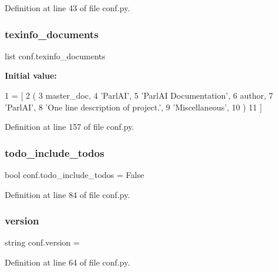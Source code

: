Definition at line 43 of file conf.\+py.

\mbox{\label{namespaceconf_a54b0faed214ac92017d5689efbb10672}} 
\subsubsection{\texorpdfstring{texinfo\+\_\+documents}{texinfo\_documents}}
{\footnotesize\ttfamily list conf.\+texinfo\+\_\+documents}

{\bfseries Initial value\+:}
\begin{DoxyCode}
1 =  [
2     (
3         master\_doc,
4         \textcolor{stringliteral}{'ParlAI'},
5         \textcolor{stringliteral}{'ParlAI Documentation'},
6         author,
7         \textcolor{stringliteral}{'ParlAI'},
8         \textcolor{stringliteral}{'One line description of project.'},
9         \textcolor{stringliteral}{'Miscellaneous'},
10     )
11 ]
\end{DoxyCode}


Definition at line 157 of file conf.\+py.

\mbox{\label{namespaceconf_a8fe7f0d85f975f4ecba5cb6066959a09}} 
\subsubsection{\texorpdfstring{todo\+\_\+include\+\_\+todos}{todo\_include\_todos}}
{\footnotesize\ttfamily bool conf.\+todo\+\_\+include\+\_\+todos = False}



Definition at line 84 of file conf.\+py.

\mbox{\label{namespaceconf_ade15c5b54093b64d7c428ec19ca5b1cb}} 
\subsubsection{\texorpdfstring{version}{version}}
{\footnotesize\ttfamily string conf.\+version = \textquotesingle{}\textquotesingle{}}



Definition at line 64 of file conf.\+py.

